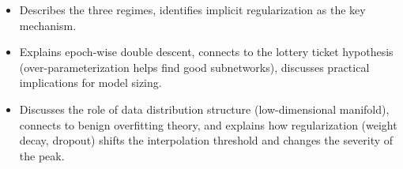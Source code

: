 \begin{interviewq}

\goodgreat
\begin{itemize}
    \item {} Describes the three regimes, identifies implicit regularization as the key mechanism.
    \item {} Explains epoch-wise double descent, connects to the lottery ticket hypothesis (over-parameterization helps find good subnetworks), discusses practical implications for model sizing.
    \item {} Discusses the role of data distribution structure (low-dimensional manifold), connects to benign overfitting theory, and explains how regularization (weight decay, dropout) shifts the interpolation threshold and changes the severity of the peak.
\end{itemize}

\end{interviewq}

\medskip

